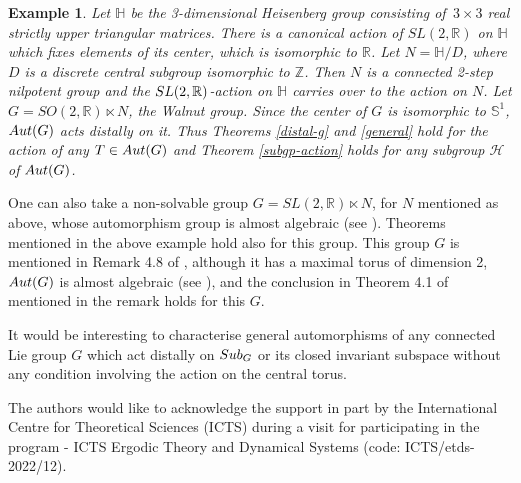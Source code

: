 \documentclass{amsart}
\numberwithin{equation}{section}
\newcommand{\Aut}{{\rm Aut}}
\newcommand{\Sub}{{\rm Sub}}
\newcommand{\Z}{{\mathbb Z}}
\newcommand{\R}{{\mathbb R}}
\newcommand{\Sc}{{\mathbb S}}
\newcommand{\Hc}{{\mathcal H}}
\newcommand{\SL}{{\rm SL}}
\newtheorem{example}[thm]{Example}
\theoremstyle{remark}
\begin{document}
\begin{example}
Let $\mathbb{H}$ be the 3-dimensional Heisenberg group consisting of $\,3\times 3$ real strictly upper triangular matrices. 
There is a canonical action of $SL(2,\R)$ on $\mathbb{H}$ which fixes elements of its center, which is isomorphic to $\R$. 
Let $N=\mathbb{H}/D$, where $D$ is a discrete central subgroup isomorphic to $\Z$. Then $N$ is a connected 2-step 
nilpotent group and the $\SL(2,\R)$-action on $\mathbb{H}$ carries over to the action on $N$. Let $G=SO(2,\R)\ltimes N$, 
the Walnut group. Since the center of $G$ is isomorphic to $\Sc^1$, $\Aut(G)$ acts distally on it. 
Thus Theorems \ref{distal-g} and \ref{general} hold for the action of any $T\in\Aut(G)$ 
and Theorem \ref {subgp-action} holds for any subgroup $\Hc$ of $\Aut(G)$. 
\end{example}

One can also take a non-solvable group $G=SL(2,\R)\ltimes N$, for $N$ mentioned as above, 
whose automorphism group is almost algebraic (see \cite{DS2}). Theorems mentioned in the above example 
hold also for this group. This group $G$ is mentioned in Remark 4.8 of \cite{SY3}, although it has a maximal torus 
of dimension 2, $\Aut(G)$ is almost algebraic (see \cite{DS2}), and the conclusion in Theorem 4.1 of \cite{SY3}
mentioned in the remark holds for this $G$. 

It would be interesting to characterise general automorphisms of any connected Lie group $G$ 
which act distally on $\Sub_G$ or its closed invariant subspace without 
any condition involving the action on the central torus. 

\smallskip
{} The authors would like to acknowledge the support in part by the International 
Centre for Theoretical Sciences (ICTS) during a visit for participating in the program - ICTS Ergodic Theory 
and Dynamical Systems (code: ICTS/etds-2022/12).
\end{document}
